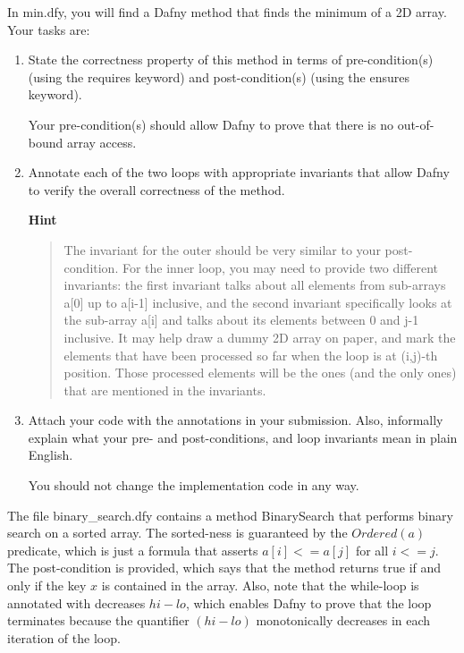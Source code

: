 \documentclass{jhwhw}
\begin{document}
In min.dfy, you will find a Dafny method that finds the minimum of a 2D array. Your tasks are:

\begin{enumerate}
    \item State the correctness property of this method in terms of pre-condition(s) (using the requires keyword) and post-condition(s) (using the ensures keyword).

    Your pre-condition(s) should allow Dafny to prove that there is no out-of-bound array access.

    \item Annotate each of the two loops with appropriate invariants that allow Dafny to verify the overall correctness of the method.

    \textbf{Hint}
    \begin{quote}
    The invariant for the outer should be very similar to your post-condition.
    For the inner loop, you may need to provide two different invariants:
    the first invariant talks about all elements from sub-arrays a[0] up to a[i-1] inclusive, and
    the second invariant specifically looks at the sub-array a[i] and talks about its elements between 0 and j-1 inclusive.
    It may help draw a dummy 2D array on paper, and mark the elements that have been processed so far when the loop is at (i,j)-th position. Those processed elements will be the ones (and the only ones) that are mentioned in the invariants.
    \end{quote}

    \item Attach your code with the annotations in your submission. Also, informally explain what your pre- and post-conditions, and loop invariants mean in plain English.

    You should not change the implementation code in any way.
\end{enumerate}

\solution

The file binary\_search.dfy contains a method BinarySearch that performs binary search on a sorted array. The sorted-ness is guaranteed by the $Ordered(a)$ predicate, which is just a formula that asserts $a[i] <= a[j]$ for all $i <= j$. The post-condition is provided, which says that the method returns true if and only if the key $x$ is contained in the array. Also, note that the while-loop is annotated with decreases $hi - lo$, which enables Dafny to prove that the loop terminates because the quantifier $(hi - lo)$ monotonically decreases in each iteration of the loop.
\end{document}

